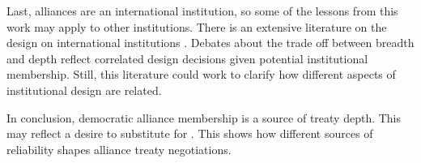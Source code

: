 \documentclass[12pt]{article}
\begin{document}
Last, alliances are an international institution, so some of the lessons from this work may apply to other institutions. 
There is an extensive literature on the design on international institutions \citep{DownesRocke1995, MartinSimmons1998, Koremenosetal2001, Koremenos2005, Thompson2010}.
Debates about the trade off between breadth and depth \citep{Downsetal1998, Gilligan2004} reflect correlated design decisions given potential institutional membership. 
Still, this literature could work to clarify how different aspects of institutional design are related. 


In conclusion, democratic alliance membership is a source of treaty depth. 
This may reflect a desire to substitute for . 
This shows how different sources of reliability shapes alliance treaty negotiations. 



\singlespace
 
 
\end{document}

